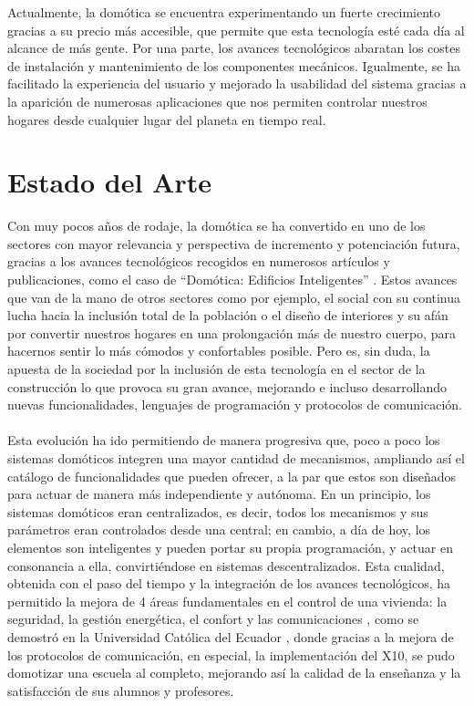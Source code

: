 Actualmente, la domótica se encuentra experimentando un fuerte crecimiento gracias a su precio más accesible, que permite que esta tecnología esté cada día al alcance de más gente. Por una parte, los avances tecnológicos abaratan los costes de instalación y mantenimiento de los componentes mecánicos. Igualmente, se ha facilitado la experiencia del usuario y mejorado la usabilidad del sistema gracias a la aparición de numerosas aplicaciones que nos permiten controlar nuestros hogares desde cualquier lugar del planeta en tiempo real. 


\section{Estado del Arte}
Con muy pocos años de rodaje, la domótica se ha convertido en uno de los sectores con mayor relevancia y perspectiva de incremento y potenciación futura, gracias a los avances tecnológicos recogidos en numerosos artículos y publicaciones, como el caso de “Domótica: Edificios Inteligentes” \cite{EI:2004}. Estos avances que van de la mano de otros sectores como por ejemplo, el social con su continua lucha hacia la inclusión total de la población o el diseño de interiores y su afán por convertir nuestros hogares en una prolongación más de nuestro cuerpo, para hacernos sentir lo más cómodos y confortables posible. Pero es, sin duda, la apuesta de la sociedad por la inclusión de esta tecnología en el sector de la construcción lo que provoca su gran avance, mejorando e incluso desarrollando nuevas funcionalidades, lenguajes de programación y protocolos de comunicación.\\\\
Esta evolución ha ido permitiendo de manera progresiva que, poco a poco los sistemas domóticos integren una mayor cantidad de mecanismos, ampliando así el catálogo de funcionalidades que pueden ofrecer, a la par que estos son diseñados para actuar de manera más independiente y autónoma. En un principio, los sistemas domóticos eran centralizados, es decir, todos los mecanismos y sus parámetros eran controlados desde una central; en cambio, a día de hoy, los elementos son inteligentes y pueden portar su propia programación, y actuar en consonancia a ella, convirtiéndose en sistemas descentralizados. Esta cualidad, obtenida con el paso del tiempo y la integración de los avances tecnológicos, ha permitido la mejora de 4 áreas fundamentales en el control de una vivienda: la seguridad, la gestión energética, el confort y las comunicaciones \cite{Andes:2011}, como se demostró en la Universidad Católica del Ecuador \cite{Ecuador:2017}, donde gracias a la mejora de los protocolos de comunicación, en especial, la implementación del X10, se pudo domotizar una escuela al completo, mejorando así la calidad de la enseñanza y la satisfacción de sus alumnos y profesores.\\\\

